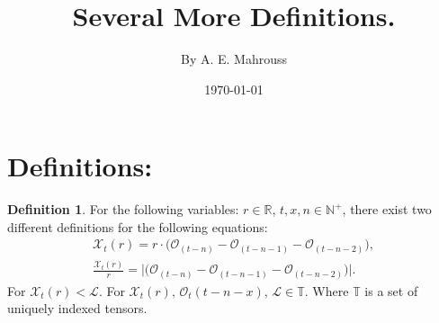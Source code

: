 \documentclass[10pt]{article}
\title{%
	\vspace{-1.5em}%
	\large\textbf{Several More Definitions.}%
}
\author{By A. E. Mahrouss}
\date{\today}
\theoremstyle{plain}
\theoremstyle{definition}
\newtheorem{definition}[theorem]{Definition}
\theoremstyle{remark}
\begin{document}

\maketitle
\tableofcontents
\newpage

\section{Definitions:}

\begin{definition}
    For the following variables: $r \in \mathbb{R}$, $t, x, n \in \mathbb{N}^{+}$, there exist two different definitions for the following equations:
    \begin{align}
        \mathcal{X}_t(r) = r \cdot \bigl(\mathcal{O}_{(t-n)} - \mathcal{O}_{(t-n-1)} - \mathcal{O}_{(t-n-2)}\bigr),\\
        \frac{\mathcal{X}_t(r)}{r} = \bigl|\bigl(\mathcal{O}_{(t-n)} - \mathcal{O}_{(t-n-1)} - \mathcal{O}_{(t-n-2)}\bigr)\bigr|.
    \end{align}
    For $\mathcal{X}_t(r) < \mathcal{L}.$ For $\mathcal{X}_t(r), \, \mathcal{O}_t(t-n-x), \, \mathcal{L} \in \mathbb{T}.$ Where $\mathbb{T}$ is a set of uniquely indexed tensors.
\end{definition}

\nocite{*}


\end{document}
